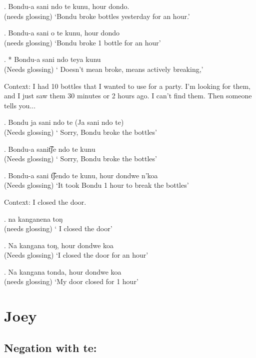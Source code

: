 \documentclass{assets/fieldnotes}
\begin{document}
{\exg. Bondu-a sani ndo te kunu, hour dondo.\\
(needs glossing)
`Bondu broke bottles yesterday for an hour.'

\exg. Bondu-a sani o te kunu, hour dondo\\
(needs glossing)
`Bondu broke 1 bottle for an hour'

\exg. * Bondu-a sani ndo teya kunu\\
(Needs glossing)
` Doesn't mean broke, means actively breaking,'

\item[ Context: I had 10 bottles that I wanted to use for a party. I'm looking for them, and I just saw them 30 minutes or 2 hours ago. I can't find them. Then someone tells you...]

\exg. Bondu ja sani ndo te (Ja sani ndo te)\\
(Needs glossing)
` Sorry, Bondu broke the bottles'

\exg. Bondu-a sanit͡ʃe ndo te kunu\\
(Needs glossing)
` Sorry, Bondu broke the bottles'

\exg. Bondu-a sani t͡ʃendo te kunu, hour dondwe n'koa\\
(Needs glossing)
`It took Bondu 1 hour to break the bottles'

\item[Context: I closed the door.]

\exg. na kanganena toŋ\\
(needs glossing)
` I closed the door'

\exg. Na kangana toŋ, hour dondwe koa\\
(Needs glossing)
`I closed the door for an hour'

\exg. Na kangana tonda, hour dondwe koa\\
(needs glossing)
`My door closed for 1 hour'


\section{Joey}



\subsection{Negation with te:}

\\


}
\end{document}
